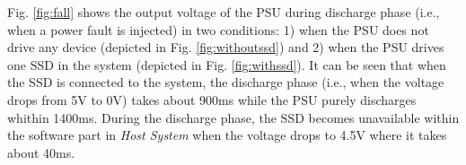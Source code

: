 Fig. \ref{fig:fall} shows the output voltage of the PSU during discharge phase (i.e., when a power fault is injected) in two conditions: 1) when the PSU does not drive any device (depicted in Fig. \ref{fig:withoutssd}) and 2) when the PSU drives one SSD in the system (depicted in Fig. \ref{fig:withssd}). It can be seen that when the SSD is connected to the system, the discharge phase (i.e., when the voltage drops from 5V to 0V) takes about 900ms while the PSU purely discharges whithin 1400ms. During the discharge phase, the SSD‌ becomes unavailable within the software part in \emph{Host System} when the voltage drops to 4.5V where it takes about 40ms. 



